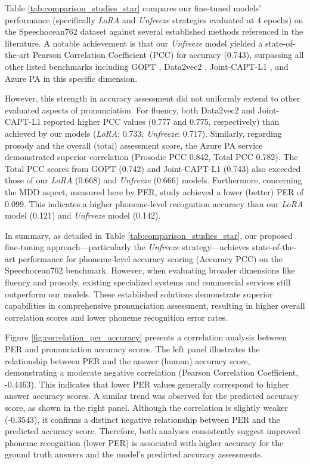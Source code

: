 \documentclass[sigconf,nonacm]{acmart}
\begin{document}
Table \ref{tab:comparison_studies_star} compares our fine-tuned models' performance (specifically \textit{LoRA} and \textit{Unfreeze} strategies evaluated at 4 epochs) on the Speechocean762 dataset against several established methods referenced in the literature. A notable achievement is that our \textit{Unfreeze} model yielded a state-of-the-art Pearson Correlation Coefficient (PCC) for accuracy (0.743), surpassing all other listed benchmarks including GOPT \cite{gong2022transformer}, Data2vec2 \cite{fu2024pronunciation}, Joint-CAPT-L1 \cite{ryu2023joint}, and Azure PA \cite{wang2025exploring} in this specific dimension.

However, this strength in accuracy assessment did not uniformly extend to other evaluated aspects of pronunciation. For fluency, both Data2vec2 and Joint-CAPT-L1 reported higher PCC values (0.777 and 0.775, respectively) than achieved by our models (\textit{LoRA}: 0.733, \textit{Unfreeze}: 0.717). Similarly, regarding prosody and the overall (total) assessment score, the Azure PA service demonstrated superior correlation (Prosodic PCC 0.842, Total PCC 0.782). The Total PCC scores from GOPT (0.742) and Joint-CAPT-L1 (0.743) also exceeded those of our \textit{LoRA} (0.668) and \textit{Unfreeze} (0.666) models. Furthermore, concerning the MDD aspect, measured here by PER, \cite{ryu2023joint} study achieved a lower (better) PER of 0.099. This indicates a higher phoneme-level recognition accuracy than our \textit{LoRA} model (0.121) and \textit{Unfreeze} model (0.142).

In summary, as detailed in Table \ref{tab:comparison_studies_star}, our proposed fine-tuning approach—particularly the \textit{Unfreeze} strategy—achieves state-of-the-art performance for phoneme-level accuracy scoring (Accuracy PCC) on the Speechocean762 benchmark. However, when evaluating broader dimensions like fluency and prosody, existing specialized systems and commercial services still outperform our models. These established solutions demonstrate superior capabilities in comprehensive pronunciation assessment, resulting in higher overall correlation scores and lower phoneme recognition error rates.

Figure \ref{fig:correlation_per_accuracy} presents a correlation analysis between PER and pronunciation accuracy scores. The left panel illustrates the relationship between PER and the answer (human) accuracy score, demonstrating a moderate negative correlation (Pearson Correlation Coefficient, -0.4463). This indicates that lower PER values generally correspond to higher answer accuracy scores. A similar trend was observed for the predicted accuracy score, as shown in the right panel. Although the correlation is slightly weaker (-0.3543), it confirms a distinct negative relationship between PER and the predicted accuracy score. Therefore, both analyses consistently suggest improved phoneme recognition (lower PER) is associated with higher accuracy for the ground truth answers and the model's predicted accuracy assessments.
\end{document}
